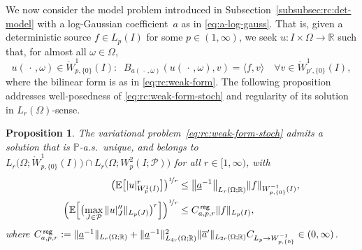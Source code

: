 \documentclass[reqno]{amsart}
\numberwithin{equation}{section}
\newcommand{\bbE}{\mathbb{E}}
\newcommand{\bbP}{\mathbb{P}}
\newcommand{\bbR}{\mathbb{R}}
\newcommand{\cP}{\mathcal{P}}
\newcommand{\norm}[2]{     \| #1       \|_{ #2 }}
\newcommand{\seminorm}[2]{  | #1        |_{ #2 }}
\newcommand{\duality}[1]{     \langle #1       \rangle}
\newcommand{\Wo}{\mathring{W}}
\newcommand{\from}{\colon}
\newtheorem{proposition}[lemma]{Proposition}
\theoremstyle{remark}
\theoremstyle{definition}
\begin{document}
We now consider the model problem introduced 
in Subsection~\ref{subsubsec:rc:det-model} 
with a log-Gaussian coefficient~$a$  
as in \eqref{eq:a-log-gauss}. 
% 
That is, given a deterministic source 
$f\in L_p(I)$ for some $p\in(1,\infty)$, 
we seek 
$u\from I\times\Omega\to\bbR$ 
such that, for almost all $\omega\in\Omega$, 
% 
\begin{equation}\label{eq:rc:weak-form-stoch} 
u(\,\cdot\,,\omega)\in \Wo^1_{p,\{0\}}(I): 
\;\; 
B_{a(\,\cdot\,,\omega)}(u(\,\cdot\,,\omega),v)
= 
\duality{ f,v }  
\quad 
\forall v\in  \Wo^1_{p'\!,\{0\}}(I), 
\end{equation}
% 
where the bilinear form is as in \eqref{eq:rc:weak-form}. 
The following proposition addresses 
well-posedness of \eqref{eq:rc:weak-form-stoch} 
and regularity of its solution  
in $L_r(\Omega)$-sense.  

\begin{proposition}\label{prop:rc:stab-u} 
	The variational 
	problem~\eqref{eq:rc:weak-form-stoch} 
	admits a solution 
	that is $\bbP$-a.s.\ unique, 
	and belongs to $L_r\bigl(\Omega; \Wo^1_{p,\{0\}}(I) \bigr) 
	\cap L_r\bigl( \Omega;W^2_p(I;\cP) \bigr)$ 
	for all $r\in[1,\infty)$, 
	with 
	\begin{align} 
	\bigl( \bbE\bigl[ \seminorm{u}{W^1_p(I) }^r \bigr] 
	\bigr)^{\nicefrac{1}{r}} 
	&\leq 
	\bigl\| \underline{a}^{-1} \bigr\|_{L_r(\Omega; \bbR)} 
	\norm{ f }{W^{-1}_{p,\{0\}}(I) }, 
	\label{eq:rc:stab-u-stoch}
	\\ 
	\Bigl( 
	\bbE\Bigl[ \bigl(\max_{J\in\cP}\norm{u|_J''}{L_p(J) } \bigr)^r 
	\Bigr] 
	\Bigr)^{\nicefrac{1}{r}}  
	&\leq  
	C_{a,p,r}^{\sf\, reg} 
	\norm{f}{L_p(I)}  ,
	\label{eq:rc:SolReg-stoch}
	\end{align} 
	where 
	$C_{a,p,r}^{\sf\, reg}  := 
	\norm{ \underline{a}^{-1} }{L_r(\Omega; \bbR)} 
	+ 
	\norm{ \underline{a}^{-1} }{L_{4r}(\Omega; \bbR)}^2
	\norm{ \overline{a}' }{L_{2r}(\Omega; \bbR)} 
	C_{L_p\to W^{-1}_{p,\{0\}}}\in(0,\infty)$.
\end{proposition}
\end{document}
